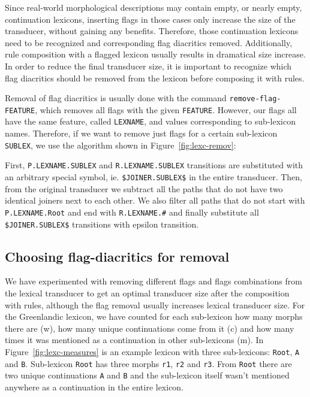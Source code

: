 \documentclass[10pt, a4paper]{article}
\begin{document}
Since real-world morphological descriptions may contain empty, or nearly
empty, continuation lexicons, inserting flags in those cases only
increase the size of the transducer, without gaining any
benefits. Therefore, those continuation lexicons need to be recognized and corresponding flag diacritics removed.
Additionally, rule composition with a flagged lexicon usually results in dramatical size
increase. In order to reduce the final transducer size, it is important to recognize which flag diacritics should be removed from the lexicon 
before composing it with rules.  

Removal of flag diacritics is usually done with the command \verb+remove-flag-FEATURE+, which removes all flags with the given \verb+FEATURE+. However, 
our flags all have the same feature, called \verb+LEXNAME+, and values corresponding to sub-lexicon names. Therefore, if we want to remove just flags 
for a certain sub-lexicon \verb+SUBLEX+, we use the algorithm shown in Figure~\ref{fig:lexc-remov}:

First, \verb+P.LEXNAME.SUBLEX+ and \verb+R.LEXNAME.SUBLEX+ transitions are substituted with an arbitrary special symbol, ie. 
\verb+$JOINER.SUBLEX$+ in the entire transducer. 
Then, from the original transducer we subtract all the paths that do not have two identical joiners next to each other. We also filter all paths that 
do not start with \verb+P.LEXNAME.Root+ and end with \verb+R.LEXNAME.#+ and finally substitute all \verb+$JOINER.SUBLEX$+ transitions with epsilon transition.

\subsection{Choosing flag-diacritics for removal}

We have experimented with removing different flags and flags combinations from the lexical transducer 
to get an optimal transducer size after the composition with rules, although the flag removal usually increases lexical transducer size. 
For the Greenlandic lexicon, we have counted 
for each sub-lexicon how many morphs there are (w), how many unique continuations come from it (c) and how many times it 
was mentioned as a continuation in other sub-lexicons (m). In Figure~\ref{fig:lexc-measures} is an example lexicon 
with three sub-lexicons: \verb+Root+, \verb+A+ and \verb+B+. Sub-lexicon \verb+Root+ has three morphs \verb+r1+, \verb+r2+ and \verb+r3+. 
From \verb+Root+ there are two unique continuations \verb+A+ and \verb+B+ and the sub-lexicon itself wasn't mentioned anywhere as a continuation in the entire lexicon.
\end{document}
